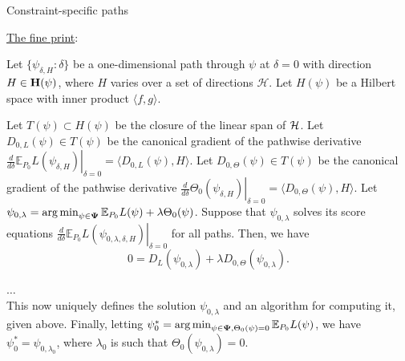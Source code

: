 \documentclass[12pt,t]{beamer}
\newcommand{\E}{\mathbb{E}}
\DeclareMathOperator*{\argmin}{arg\,min}
\begin{document}
\begin{frame}[c]{Constraint-specific paths}

\begin{center}
\underline{The fine print}:

\scriptsize{
\begin{theorem}
Let $\{\psi_{\delta, H}: \delta \}$ be a one-dimensional path through $\psi$ at
$\delta = 0$ with direction $H \in {\bf H}(\psi)$, where $H$ varies over a set
of directions $\mathcal{H}$. Let $H(\psi)$ be a Hilbert space with inner product
$\langle f, g \rangle$.

\vspace{1em}

Let $T(\psi) \subset H(\psi)$ be the closure of the linear span of ${\cal H}$.
Let $D_{0, L}(\psi) \in T(\psi)$ be the canonical gradient of the pathwise
derivative $\left . \frac{d}{d \delta} \E_{P_0}L(\psi_{\delta, H}) \right
|_{\delta = 0} = \langle D_{0, L}(\psi), H \rangle$. Let $D_{0, \Theta}(\psi)
\in T(\psi)$ be the canonical gradient of the pathwise derivative $\left .
 \frac{d}{d \delta}\Theta_0(\psi_{\delta, H}) \right |_{\delta = 0} =
 \langle D_{0, \Theta}(\psi), H \rangle$. Let
$\psi_{0, \lambda} = \argmin_{\psi \in {\bf \Psi}} \E_{P_0}L(\psi) + \lambda
\Theta_0(\psi)$. Suppose that $\psi_{0, \lambda}$ solves its score equations
$\left . \frac{d}{d \delta} \E_{P_0}L(\psi_{0, \lambda, \delta, H}) \right
|_{\delta = 0}$ for all paths. Then, we have
\begin{equation}\label{lfmpathconditiona}
0 = D_L(\psi_{0, \lambda}) + \lambda D_{0, \Theta}(\psi_{0, \lambda}).
\end{equation}

$\dots$\\

This now uniquely defines the solution $\psi_{0, \lambda}$ and an algorithm for
computing it, given above. Finally, letting $\psi_0^* = \argmin_{\psi \in {\bf
\Psi}, \Theta_0(\psi) = 0} \E_{P_0}L(\psi)$, we have $\psi_0^* = \psi_{0,
 \lambda_0}$, where $\lambda_0$ is such that $\Theta_0(\psi_{0, \lambda}) = 0$.
\end{theorem}
}

\end{center}

\note{
}

\end{frame}

\end{document}
